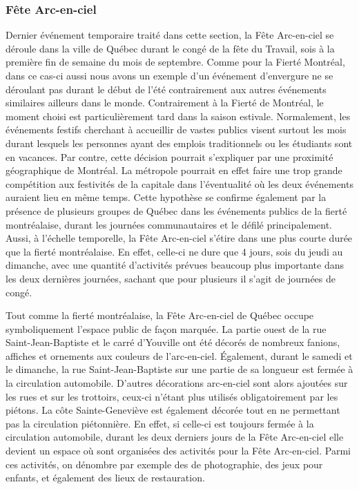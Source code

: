 \subsubsection{Fête Arc-en-ciel}
\label{subsec:fetearcenciel}
Dernier événement temporaire traité dans cette section, la Fête Arc-en-ciel se déroule dans la ville de Québec durant le congé de la fête du Travail, sois à la première fin de semaine du mois de septembre.
Comme pour la Fierté Montréal, dans ce cas-ci aussi nous avons un exemple d'un événement d'envergure ne se déroulant pas durant le début de l'été contrairement aux autres événements similaires ailleurs dans le monde.
Contrairement à la Fierté de Montréal, le moment choisi est particulièrement tard dans la saison estivale.
Normalement, les événements festifs cherchant à accueillir de vastes publics visent surtout les mois durant lesquels les personnes ayant des emplois traditionnels ou les étudiants sont en vacances.
Par contre, cette décision pourrait s'expliquer par une proximité géographique de Montréal.
La métropole pourrait en effet faire une trop grande compétition aux festivités de la capitale dans l'éventualité où les deux événements auraient lieu en même temps.
Cette hypothèse se confirme également par la présence de plusieurs groupes de Québec dans les événements publics de la fierté montréalaise, durant les journées communautaires et le défilé principalement.
Aussi, à l'échelle temporelle, la Fête Arc-en-ciel s'étire dans une plus courte durée que la fierté montréalaise.
En effet, celle-ci ne dure que 4 jours, sois du jeudi au dimanche, avec une quantité d'activités prévues beaucoup plus importante dans les deux dernières journées, sachant que pour plusieurs il s'agit de journées de congé.

Tout comme la fierté montréalaise, la Fête Arc-en-ciel de Québec occupe symboliquement l'espace public de façon marquée.
La partie ouest de la rue Saint-Jean-Baptiste et le carré d'Youville ont été décorés de nombreux fanions, affiches et ornements aux couleurs de l'arc-en-ciel.
Également, durant le samedi et le dimanche, la rue Saint-Jean-Baptiste sur une partie de sa longueur est fermée à la circulation automobile.
D'autres décorations arc-en-ciel sont alors ajoutées sur les rues et sur les trottoirs, ceux-ci n'étant plus utilisés obligatoirement par les piétons.
La côte Sainte-Geneviève est également décorée tout en ne permettant pas la circulation piétonnière.
En effet, si celle-ci est toujours fermée à la circulation automobile, durant les deux derniers jours de la Fête Arc-en-ciel elle devient un espace où sont organisées des activités pour la Fête Arc-en-ciel. Parmi ces activités, on dénombre par exemple des  de photographie, des jeux pour enfants, et également des lieux de restauration.

